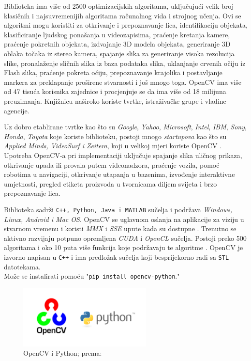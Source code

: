 \documentclass[]{foi} %
\begin{document}
Biblioteka ima više od 2500 optimizacijskih algoritama, uključujući velik broj klasičnih i najsuvremenijih algoritama računalnog vida i strojnog učenja. Ovi se algoritmi mogu koristiti \cite{opencv} za otkrivanje i prepoznavanje lica, identifikaciju objekata, klasificiranje ljudskog ponašanja u videozapisima, praćenje kretanja kamere, praćenje pokretnih objekata, izdvajanje 3D modela objekata, generiranje 3D oblaka točaka iz stereo kamera, spajanje slika za generiranje visoka rezolucija slike, pronalaženje sličnih slika iz baza podataka slika, uklanjanje crvenih očiju iz Flash slika, praćenje pokreta očiju, prepoznavanje krajolika i postavljanje markera za preklapanje proširene stvarnosti i još mnogo toga. OpenCV ima više od 47 tisuća korisnika zajednice i procjenjuje se da ima više od 18 milijuna preuzimanja. Knjižnicu naširoko koriste tvrtke, istraživačke grupe i vladine agencije.

Uz dobro etablirane tvrtke kao što su \textit{Google}, \textit{Yahoo}, \textit{Microsoft}, \textit{Intel}, \textit{IBM}, \textit{Sony}, \textit{Honda}, \textit{Toyota} koje koriste biblioteku, postoji mnogo \textit{startupova} kao što su \textit{Applied Minds, VideoSurf i Zeitera}, koji u velikoj mjeri koriste OpenCV \cite{opencv}. Upotreba OpenCV-a pri implementaciji uključuje spajanje slika uličnog prikaza, otkrivanje upada ili provala putem videonadzora, praćenje vozila, pomoć robotima u navigaciji, otkrivanje utapanja u bazenima, izvođenje interaktivne umjetnosti, pregled etiketa proizvoda u tvornicama diljem svijeta i brzo prepoznavanje lica.

Biblioteka sadrži \texttt{C++, Python, Java i MATLAB} sučelja i podržava \textit{Windows, Linux, Android i Mac OS}. OpenCV se uglavnom oslanja na aplikacije za viziju u stvarnom vremenu i koristi \textit{MMX} i \textit{SSE} upute kada su dostupne \cite{opencv}. Trenutno se aktivno razvijaju potpuno opremljena \textit{CUDA} i \textit{OpenCL} sučelja. Postoji preko 500 algoritama i oko 10 puta više funkcija koje podržavaju te algoritme \cite{opencv}. OpenCV je izvorno napisan u \texttt{C++} i ima predložak sučelja koji besprijekorno radi sa \texttt{STL} datotekama.\\ Može se instalirati pomoću "\texttt{pip install opencv-python}."


\begin{figure}[!ht]
    \centering
    \includegraphics[width=0.6\textwidth]{slike/opencv.png}
    \caption{OpenCV i Python; prema: \cite{opencv}}
    \label{fig:opencv}
\end{figure}
\end{document}
